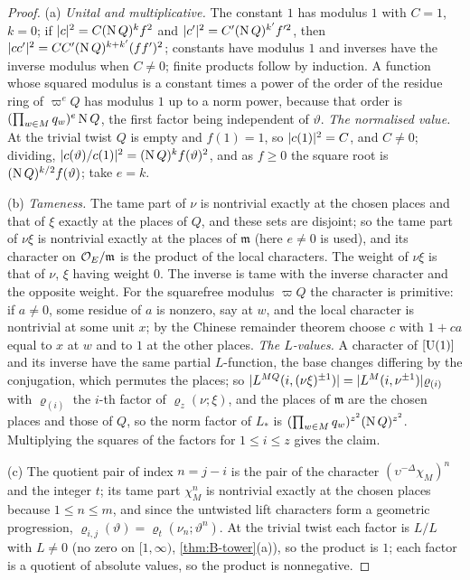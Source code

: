\begin{proof}
(a) \emph{Unital and multiplicative.} The constant $1$ has modulus $1$ with $C=1$, $k=0$; if $\lvert c\rvert^2=C(\operatorname{N} Q)^kf^2$ and $\lvert c'\rvert^2=C'(\operatorname{N} Q)^{k'}f'^2$, then $\lvert cc'\rvert^2=CC'(\operatorname{N} Q)^{k+k'}(ff')^2$; constants have modulus $1$ and
inverses have the inverse modulus when $C\ne0$; finite products follow by induction. A function whose squared modulus is a constant times a power of the order of the residue ring of $\varpi^eQ$ has modulus $1$ up to a
norm power, because that order is $(\prod_{w\in M}q_w)^e\operatorname{N} Q$, the first factor being independent of $\vartheta$. \emph{The normalised value.} At the trivial twist $Q$ is empty and $f(1)=1$, so $\lvert c(1)\rvert^2=C$, and
$C\ne0$; dividing, $\lvert c(\vartheta)/c(1)\rvert^2=(\operatorname{N} Q)^kf(\vartheta)^2$, and as $f\ge0$ the square root is $(\operatorname{N} Q)^{k/2}f(\vartheta)$; take $e=k$.

(b) \emph{Tameness.} The tame part of $\nu$ is nontrivial exactly at the chosen places and that of $\xi$ exactly at the places of $Q$, and these sets are disjoint; so the tame part of $\nu\xi$ is nontrivial exactly at
the places of $\mathfrak m$ (here $e\ne0$ is used), and its character on $\mathcal{O}_E/\mathfrak m$ is the product of the local characters. The weight of $\nu\xi$ is that of $\nu$, $\xi$ having weight $0$. The inverse is tame with
the inverse character and the opposite weight. For the squarefree modulus $\varpi Q$ the character is primitive: if $a\ne0$, some residue of $a$ is nonzero, say at $w$, and the local character is nontrivial at
some unit $x$; by the Chinese remainder theorem choose $c$ with $1+ca$ equal to $x$ at $w$ and to $1$ at the other places. \emph{The $L$-values.} A character of $[\operatorname{U}(1)]$ and its inverse have the same partial
$L$-function, the base changes differing by the conjugation, which permutes the places; so $\lvert L^{MQ}(i,(\nu\xi)^{\pm1})\rvert=\lvert L^M(i,\nu^{\pm1})\rvert\varrho_{(i)}$ with $\varrho_{(i)}$ the $i$-th factor of $\varrho_z(\nu;\xi)$, and the
places of $\mathfrak m$ are the chosen places and those of $Q$, so the norm factor of $L_*$ is $(\prod_{w\in M}q_w)^{z^2}(\operatorname{N} Q)^{z^2}$. Multiplying the squares of the factors for $1\le i\le z$ gives the claim.

(c) The quotient pair of index $n=j-i$ is the pair of the character $(\upsilon^{-\Delta}\chi_M)^n$ and the integer $t$; its tame part $\chi_M^n$ is nontrivial exactly at the chosen places because $1\le n\le m$, and since
the untwisted lift characters form a geometric progression, $\varrho_{i,j}(\vartheta)=\varrho_t(\nu_n;\vartheta^n)$. At the trivial twist each factor is $L/L$ with $L\ne0$ (no zero on $[1,\infty)$, \cref{thm:B-tower}(a)), so the
product is $1$; each factor is a quotient of absolute values, so the product is nonnegative.
\end{proof}


